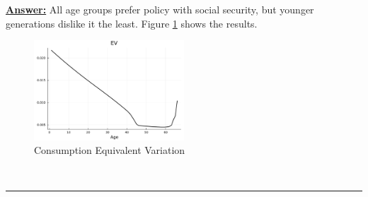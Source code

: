 \documentclass{article} %
\theoremstyle{definition}
\newenvironment{solution}[1][Answer]{\begin{singlespace}\underline{\textbf{#1:}}\quad }{\ \rule{0.3em}{0.3em}\end{singlespace}} %
\begin{document}
\begin{enumerate}
\begin{solution}
    All age groups prefer policy with social security, but younger generations dislike it the least. Figure \ref{EV1} shows the results.

\begin{figure}[htbp]
    \begin{center}
      \includegraphics[width=0.5\textwidth]{Figures/EV.pdf}
	\caption{Consumption Equivalent Variation}
      \label{EV1}
    \end{center}
\end{figure}
    
  \end{solution}
\end{enumerate}
\end{document}
